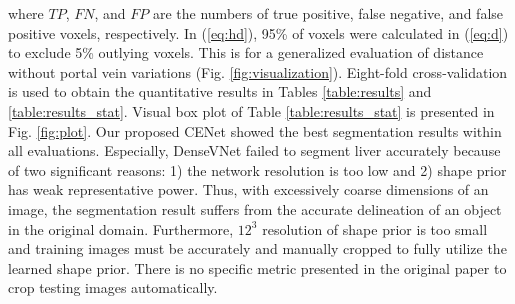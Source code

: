 \documentclass[journal]{IEEEtran}
\begin{document}
\noindent
where \(TP\), \(FN\), and \(FP\) are the numbers of true positive, false negative, and false positive voxels, respectively. In (\ref{eq:hd}), 95\% of voxels were calculated in (\ref{eq:d}) to exclude 5\% outlying voxels. This is for a generalized evaluation of distance without portal vein variations (Fig. \ref{fig:visualization}). Eight-fold cross-validation is used to obtain the quantitative results in Tables \ref{table:results} and \ref{table:results_stat}. Visual box plot of Table \ref{table:results_stat} is presented in Fig. \ref{fig:plot}. Our proposed CENet showed the best segmentation results within all evaluations. Especially, DenseVNet failed to segment liver accurately because of two significant reasons: 1) the network resolution is too low and 2) shape prior has weak representative power. Thus, with excessively coarse dimensions of an image, the segmentation result suffers from the accurate delineation of an object in the original domain. Furthermore, \(12^3\) resolution of shape prior is too small and training images must be accurately and manually cropped to fully utilize the learned shape prior. There is no specific metric presented in the original paper \cite{gibson2018automatic} to crop testing images automatically.\par
\end{document}
